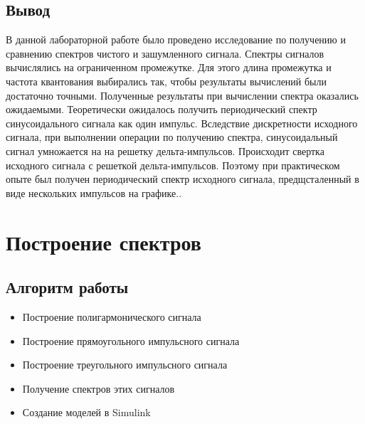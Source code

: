 \documentclass[10pt,a4paper]{report}
\begin{document}
\section{Вывод}
В данной лабораторной работе было проведено исследование по получению и сравнению спектров чистого и зашумленного сигнала. Спектры сигналов вычислялись на ограниченном промежутке. 
Для этого длина промежутка и частота квантования выбирались так, чтобы результаты вычислений были достаточно точными. Полученные результаты при вычислении спектра оказались ожидаемыми.
Теоретически ожидалось получить периодический спектр синусоидального сигнала как один импульс. Вследствие дискретности исходного сигнала, при выполнении операции по получению спектра,
синусоидальный сигнал умножается на на решетку дельта-импульсов. Происходит свертка исходного сигнала с решеткой дельта-импульсов. Поэтому при практическом опыте был получен
периодический спектр исходного сигнала, предщсталенный в виде нескольких импульсов на графике.. \newline

\chapter{Построение спектров}
\section{Алгоритм работы}
\begin{itemize}
\item Построение полигармонического сигнала
\item Построение прямоугольного импульсного сигнала
\item Построение треугольного импульсного сигнала
\item Получение спектров этих сигналов
\item Создание моделей в Simulink
\end{itemize}
\end{document}
